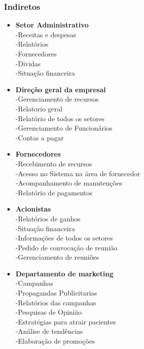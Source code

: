 \subsubsection{ Indiretos}

\begin{itemize}
      \item \textbf{Setor Administrativo}\\
            -Receitas e despesas\\
            -Relatórios\\
            -Fornecedores\\
            -Dividas\\
            -Situação financeira\\


      \item \textbf{Direção geral da empresal}\\
            -Gerenciamento de recursos\\
            -Relatorio geral\\
            -Relatório de todos os setores\\
            -Gerenciamento de Funcionários\\
            -Contas a pagar\\


      \item \textbf{Fornecedores}\\
            -Recebimento de recursos\\
            -Acesso no Sistema na área de fornecedor\\
            -Acompanhamento de manutenções\\
            -Relatório de pagamentos\\





      \item \textbf{Acionistas}\\
            -Relatórios de ganhos\\
            -Situação financeira\\
            -Informações de todos os setores\\
            -Pedido de convocação de reunião\\
            -Gerenciamento de reuniões\\



      \item \textbf{Departamento de marketing}\\
            -Campanhas\\
            -Propagandas Publicitarias\\
            -Relatórios das campanhas\\
            -Pesquisas de Opinião\\
            -Estratégias para atrair pacientes\\
            -Análise de tendências\\
            -Elaboração de promoções\\
\end{itemize}




